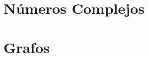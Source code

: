 \documentclass[9pt,a4paper,draft]{article}
\theoremstyle{definition}
\theoremstyle{plain}
\begin{document}
\part{Números Complejos}

\part{Grafos}
\end{document}

